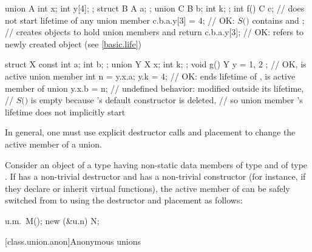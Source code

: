 \begin{example}
\begin{codeblock}
union A { int x; int y[4]; };
struct B { A a; };
union C { B b; int k; };
int f() {
  C c;                  // does not start lifetime of any union member
  c.b.a.y[3] = 4;       // OK: $S($$)$ contains  and ;
                        // creates objects to hold union members  and 
  return c.b.a.y[3];    // OK:  refers to newly created object (see \ref{basic.life})
}

struct X { const int a; int b; };
union Y { X x; int k; };
void g() {
  Y y = { { 1, 2 } };   // OK,  is active union member
  int n = y.x.a;
  y.k = 4;              // OK: ends lifetime of ,  is active member of union
  y.x.b = n;            // undefined behavior:  modified outside its lifetime,
                        // $S($$)$ is empty because 's default constructor is deleted,
                        // so union member 's lifetime does not implicitly start
}
\end{codeblock}
\end{example}

\pnum
\begin{note}
In general, one must use explicit destructor calls and placement
 to change the active member of a union.
\end{note}
\begin{example}
Consider an object  of a  type  having non-static data members
 of type  and  of type . If  has a non-trivial
destructor and  has a non-trivial constructor (for instance, if they declare or inherit
virtual functions), the active member of  can be safely switched from  to
 using the destructor and placement  as follows:

\begin{codeblock}
u.m.~M();
new (&u.n) N;
\end{codeblock}
\end{example}

[class.union.anon]{Anonymous unions}
%

